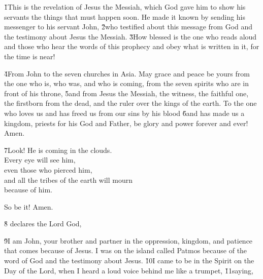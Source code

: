 


\v{1}This is the revelation of Jesus the Messiah, which God gave him to show his servants the things that must happen soon. He made it known by sending his messenger to his servant John, \v{2}who testified about this message from God and the testimony about Jesus the Messiah. \v{3}How blessed is the one who reads aloud and those who hear the words of this prophecy and obey what is written in it, for the time is near!

\v{4}From John to the seven churches in Asia. May grace and peace be yours from the one who is, who was, and who is coming, from the seven spirits who are in front of his throne, \v{5}and from Jesus the Messiah, the witness, the faithful one, the firstborn from the dead, and the ruler over the kings of the earth. To the one who loves us and has freed us from our sins by his blood \v{6}and has made us a kingdom, priests for his God and Father, be glory and power forever and ever! Amen.

\begin{poetry}
\poeml \v{7}Look! He is coming in the clouds. \\
\poemll    Every eye will see him, \\
\poemlll       even those who pierced him, \\
\poeml and all the tribes of the earth will mourn \\
\poemll    because of him.
\end{poetry}

So be it! Amen.

\v{8} declares the Lord God,

\v{9}I am John, your brother and partner in the oppression, kingdom, and patience that comes because of Jesus. I was on the island called Patmos because of the word of God and the testimony about Jesus. \v{10}I came to be in the Spirit on the Day of the Lord, when I heard a loud voice behind me like a trumpet, \v{11}saying, \red{, }\red{, }\red{, }

